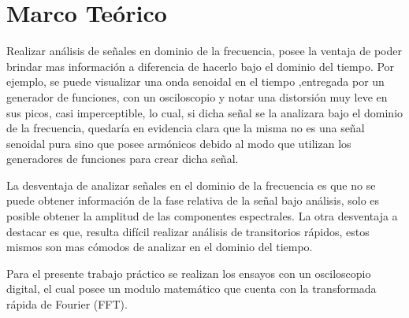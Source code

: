   \section{Marco Teórico}

    Realizar análisis de señales en dominio de la frecuencia, posee la ventaja de poder 
    brindar mas información a diferencia de hacerlo bajo el dominio del tiempo. 
    Por ejemplo, se puede visualizar una onda senoidal en el tiempo ,entregada 
    por un generador de funciones, con un osciloscopio y notar una distorsión muy leve 
    en sus picos, casi imperceptible, lo cual, si dicha señal se la analizara bajo el 
    dominio de la frecuencia, quedaría en evidencia clara que la misma no es una señal 
    senoidal pura sino que posee armónicos debido al modo que utilizan los generadores 
    de funciones para crear dicha señal.
    
    La desventaja de analizar señales en el 
    dominio de la frecuencia es que no se puede obtener información de la fase relativa de 
    la señal bajo análisis, solo es posible obtener la amplitud de las componentes
    espectrales. La otra desventaja a destacar es que, resulta difícil realizar análisis de 
    transitorios rápidos, estos mismos son mas cómodos de analizar en el dominio del tiempo.
    
    Para el presente trabajo práctico se realizan los ensayos con un osciloscopio digital,
    el cual posee un modulo matemático  que cuenta con la transformada 
    rápida de Fourier (FFT). 

        
    




